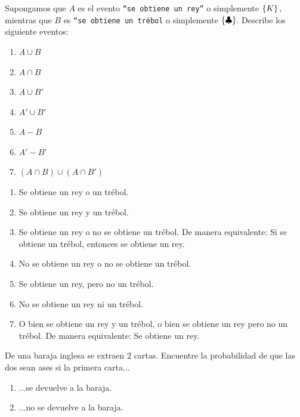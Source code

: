 \begin{problema}
	\label{problema:2.2}
	Supongamos que $A$ es el evento \texttt{``se obtiene un rey''} o simplemente $\left\{ K \right\},$ mientras que $B$ es \texttt{``se obtiene un tr\'ebol} o simplemente $\left\{ \clubsuit \right\}$. Describe los siguiente eventos: 
	\begin{enumerate}
		\item $A\cup B$ 
		\item $A\cap B$ 
		\item $A \cup B'$ 
		\item $A' \cup B'$ 
		\item $A - B$ 
		\item $A'-B'$ 
		\item $(A\cap B) \cup (A\cap B')$
	\end{enumerate}
\end{problema}

\begin{solucion}
	\label{solucion:2.2}
	
	\begin{enumerate}
		\item Se obtiene un rey o un trébol.
		\item Se obtiene un rey y un trébol.
		\item Se obtiene un rey o no se obtiene un trébol. De manera equivalente: Si se obtiene un trébol, entonces se obtiene un rey. 
		\item No se obtiene un rey o no se obtiene un trébol.
		\item Se obtiene un rey, pero no un trébol. 
		\item No se obtiene un rey ni un trébol.
		\item O bien se obtiene un rey y un trébol, o bien se obtiene un rey pero no un trébol. De manera equivalente: Se obtiene un rey.		
	\end{enumerate}
\end{solucion}



\begin{problema}
	\label{problema:2.3}
	De una baraja inglesa se extraen 2 cartas. Encuentre la probabilidad de que las dos sean ases si la primera carta...
	\begin{enumerate}
		\item ...se devuelve a la baraja.
		\item ...no se devuelve a la baraja.
	\end{enumerate}
	
\end{problema}

